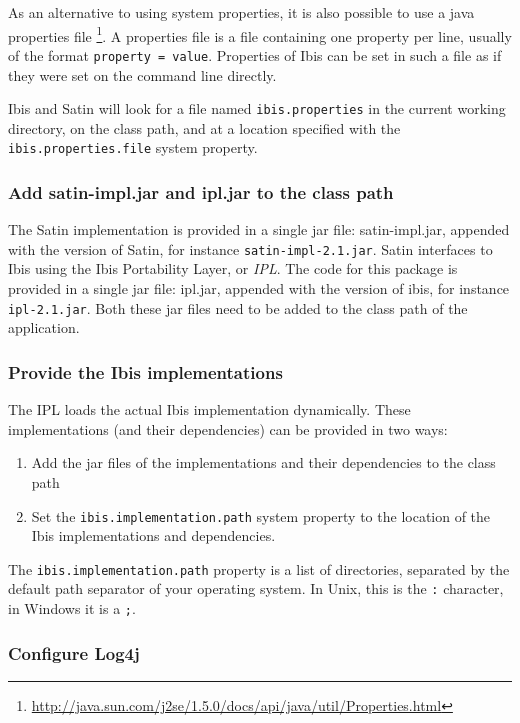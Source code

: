 \documentclass[a4paper,10pt]{article}
\begin{document}
As an alternative to using system properties, it is also possible to use
a java properties file
\footnote{\url{http://java.sun.com/j2se/1.5.0/docs/api/java/util/Properties.html}}.
A properties file is a file containing one property per line, usually of
the format \texttt{property = value}. Properties of Ibis can be set in
such a file as if they were set on the command line directly.

Ibis and Satin will look for a file named \texttt{ibis.properties} in the
current working directory, on the class path, and at a location specified
with the \texttt{ibis.properties.file} system property.

\subsubsection{Add satin-impl.jar and ipl.jar to the class path}

The Satin implementation is provided in a single jar file: satin-impl.jar,
appended with the version of Satin, for instance \texttt{satin-impl-2.1.jar}.
Satin interfaces to Ibis using the Ibis Portability Layer, or
\emph{IPL}. The code for this package is provided in a single jar file:
ipl.jar, appended with the version of ibis, for instance \texttt{ipl-2.1.jar}.
Both these jar files need to be added to the class path of the application.

\subsubsection{Provide the Ibis implementations}

The IPL loads the actual Ibis implementation dynamically.
These implementations (and their dependencies) can be provided in two
ways:

\begin{enumerate}
\item Add the jar files of the implementations and their dependencies to
      the class path
\item Set the \texttt{ibis.implementation.path} system property to the
      location of the Ibis implementations and dependencies.
\end{enumerate}

The \texttt{ibis.implementation.path} property is a list of directories,
separated by the default path separator of your operating system. In
Unix, this is the \texttt{:} character, in Windows it is a \texttt{;}.

\subsubsection{Configure Log4j}
\end{document}
